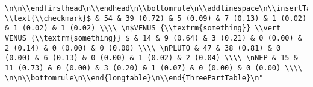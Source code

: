 \documentclass[]{article}
\def\checkmark{\tikz\fill[scale=0.4](0,.35) -- (.25,0) -- (1,.7) -- (.25,.15) -- cycle;}
\begin{document}
\begin{verbatim}
\n\n\\endfirsthead\n\\endhead\n\\bottomrule\n\\addlinespace\n\\insertTableNotes\n\\endlastfoot\n\\midrule\n$something_{\\textrm{something}} \\text{\\checkmark}$ & 54 & 39 (0.72) & 5 (0.09) & 7 (0.13) & 1 (0.02) & 1 (0.02) & 1 (0.02) \\\\ \n$VENUS_{\\textrm{something}} \\vert VENUS_{\\textrm{something}} $ & 14 & 9 (0.64) & 3 (0.21) & 0 (0.00) & 2 (0.14) & 0 (0.00) & 0 (0.00) \\\\ \nPLUTO & 47 & 38 (0.81) & 0 (0.00) & 6 (0.13) & 0 (0.00) & 1 (0.02) & 2 (0.04) \\\\ \nNEP & 15 & 11 (0.73) & 0 (0.00) & 3 (0.20) & 1 (0.07) & 0 (0.00) & 0 (0.00) \\\\ \n\n\\bottomrule\n\\end{longtable}\n\\end{ThreePartTable}\n"
\end{verbatim}
\end{document}
